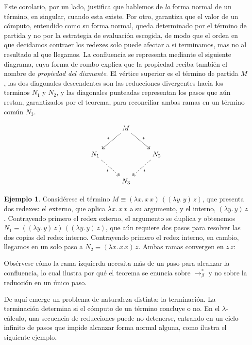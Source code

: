 \documentclass[a4paper,12pt]{report}
\theoremstyle{definition}
\newtheorem{example}{Ejemplo}[chapter]
\theoremstyle{plain}
\theoremstyle{remark}
\begin{document}
Este corolario, por un lado, justifica que hablemos de \textit{la} forma normal de un término, en singular, cuando esta existe. Por otro, garantiza que el valor de un cómputo, entendido como su forma normal, queda determinado por el término de partida y no por la estrategia de evaluación escogida, de modo que el orden en que decidamos contraer los redexes solo puede afectar a si terminamos, mas no al resultado al que llegamos.
\newline
\newline
La confluencia se representa mediante el siguiente diagrama, cuya forma de rombo explica que la propiedad reciba también el nombre de \textit{propiedad del diamante}. El vértice superior es el término de partida $M$, las dos diagonales descendentes son las reducciones divergentes hacia los terminos $N_1$ y $N_2$, y las diagonales punteadas representan los pasos que aún restan, garantizados por el teorema, para reconciliar ambas ramas en un término común $N_3$.

\[
\begin{tikzcd}[row sep=2.4em, column sep=2.4em]
 & M \arrow[dl, twoheadrightarrow, "\ast"'] \arrow[dr, twoheadrightarrow, "\ast"] & \\
N_1 \arrow[dr, twoheadrightarrow, dashed, "\ast"'] & & N_2 \arrow[dl, twoheadrightarrow, dashed, "\ast"] \\
 & N_3 &
\end{tikzcd}
\]

\begin{example}
  Considérese el término $M \equiv (\lambda x.\, x\,x)\,((\lambda y.\, y)\, z)$, que presenta
  dos redexes: el externo, que aplica $\lambda x.\, x\,x$ a su argumento, y el interno,
  $(\lambda y.\, y)\, z$. Contrayendo primero el redex externo, el argumento se duplica y
  obtenemos $N_1 \equiv ((\lambda y.\, y)\, z)\,((\lambda y.\, y)\, z)$, que aún requiere dos
  pasos para resolver las dos copias del redex interno. Contrayendo primero el redex interno,
  en cambio, llegamos en un solo paso a $N_2 \equiv (\lambda x.\, x\,x)\, z$. Ambas ramas
  convergen en $z\,z$:


  Obsérvese cómo la rama izquierda necesita más de un paso para alcanzar la confluencia, lo
  cual ilustra por qué el teorema se enuncia sobre $\to_\beta^{\ast}$ y no sobre la reducción
  en un único paso.
\end{example}

De aquí emerge un problema de naturaleza distinta: la terminación. La terminación determina si el cómputo de un término concluye o no. En el $\lambda$-cálculo, una secuencia de reducciones puede no detenerse, entrando en un ciclo infinito de pasos que impide alcanzar forma normal alguna, como ilustra el siguiente ejemplo.
\end{document}
